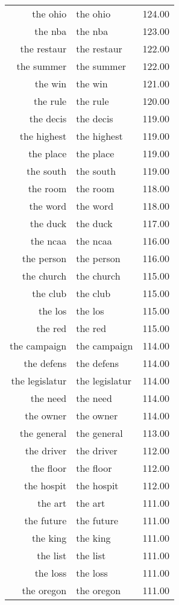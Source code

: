 \begin{table}[ht]
\begin{tabular}{rlr}
  the ohio & the ohio & 124.00 \\ 
  the nba & the nba & 123.00 \\ 
  the restaur & the restaur & 122.00 \\ 
  the summer & the summer & 122.00 \\ 
  the win & the win & 121.00 \\ 
  the rule & the rule & 120.00 \\ 
  the decis & the decis & 119.00 \\ 
  the highest & the highest & 119.00 \\ 
  the place & the place & 119.00 \\ 
  the south & the south & 119.00 \\ 
  the room & the room & 118.00 \\ 
  the word & the word & 118.00 \\ 
  the duck & the duck & 117.00 \\ 
  the ncaa & the ncaa & 116.00 \\ 
  the person & the person & 116.00 \\ 
  the church & the church & 115.00 \\ 
  the club & the club & 115.00 \\ 
  the los & the los & 115.00 \\ 
  the red & the red & 115.00 \\ 
  the campaign & the campaign & 114.00 \\ 
  the defens & the defens & 114.00 \\ 
  the legislatur & the legislatur & 114.00 \\ 
  the need & the need & 114.00 \\ 
  the owner & the owner & 114.00 \\ 
  the general & the general & 113.00 \\ 
  the driver & the driver & 112.00 \\ 
  the floor & the floor & 112.00 \\ 
  the hospit & the hospit & 112.00 \\ 
  the art & the art & 111.00 \\ 
  the future & the future & 111.00 \\ 
  the king & the king & 111.00 \\ 
  the list & the list & 111.00 \\ 
  the loss & the loss & 111.00 \\ 
  the oregon & the oregon & 111.00 \\ 

\end{tabular}
\end{table}
